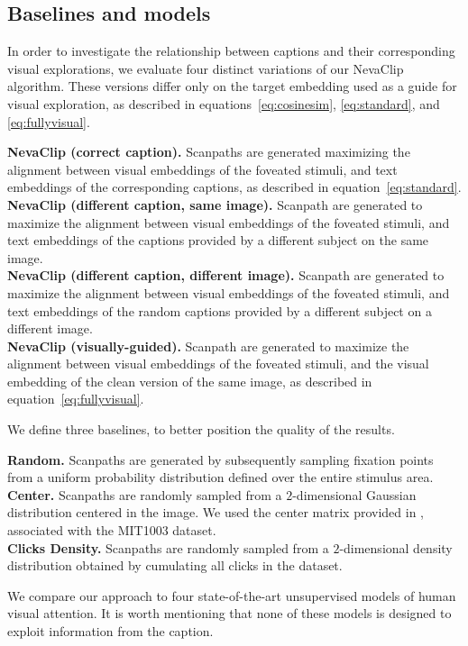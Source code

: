 \documentclass{article}
\begin{document}
\subsection{Baselines and models}
In order to investigate the relationship between captions and their corresponding visual explorations, we evaluate four distinct variations of our NevaClip algorithm. These versions differ only on the target embedding used as a guide for visual exploration, as described in equations~\ref{eq:cosinesim}, \ref{eq:standard}, and \ref{eq:fullyvisual}.

\textbf{NevaClip (correct caption).} Scanpaths are generated maximizing the alignment between visual embeddings of the foveated stimuli, and text embeddings of the corresponding captions, as described in equation~\ref{eq:standard}.\\
\textbf{NevaClip (different caption, same image). }Scanpath are generated to maximize the alignment between visual embeddings of the foveated stimuli, and text embeddings of the captions provided by a different subject on the same image.\\
\textbf{NevaClip (different caption, different image).} Scanpath are generated to maximize the alignment between visual embeddings of the foveated stimuli, and text embeddings of the random captions provided by a different subject on a different image.\\
\textbf{NevaClip (visually-guided).} Scanpath are generated to maximize the alignment between visual embeddings of the foveated stimuli, and the visual embedding of the clean version of the same image, as described in equation~\ref{eq:fullyvisual}.

We define three baselines, to better position the quality of the results.

\textbf{Random.} Scanpaths are generated by subsequently sampling fixation points from a uniform probability distribution defined over the entire stimulus area.\\
\textbf{Center.} Scanpaths are randomly sampled from a $2$-dimensional Gaussian distribution centered in the image. We used the center matrix provided in \citet{judd2009learning}, associated with the MIT1003 dataset.\\
\textbf{Clicks Density.} Scanpaths are randomly sampled from a $2$-dimensional density distribution obtained by cumulating all clicks in the dataset.

We compare our approach to four state-of-the-art unsupervised models of human visual attention. It is worth mentioning that none of these models is designed to exploit information from the caption.
\end{document}

